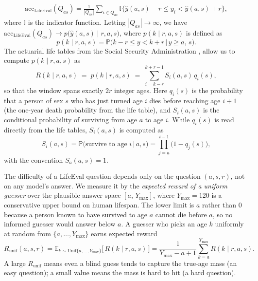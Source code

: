 \documentclass{article}
\begin{document}
\begin{align}
    \text{acc}_{\text{LifeEval}}(Q_{as})
    = \frac{1}{|Q_{as}|}\sum_{i\in Q_{as}}
      \mathbb{I}\bigl\{\hat{y}(a,s) - r \le y_i < \hat{y}(a,s) + r \bigr\},
\end{align}
where $\mathbb{I}$ is the indicator function. Letting $|Q_{as}|\to\infty$, we have $\text{acc}_{\text{LifeEval}}(Q_{as}) \rightarrow p\bigl(\hat{y}(a,s) \mid r,a,s\bigr)$, where $p(k \mid r,a,s)$ is defined as
\begin{equation}
    p(k \mid r,a,s) = \mathbb{P}\bigl( k - r \le y < k + r \,\big|\, y\geq a,\, s\bigr).
\end{equation}
The actuarial life tables from the Social Security Administration \citep{SSA2022LifeTable}, allow us to compute $p(k \mid r,a,s)$ as
\begin{equation}
    R(k \mid r,a,s) \;=\; p(k \mid r,a,s) \;=\; \sum_{i=k-r}^{k+r-1} S_i(a,s)\,q_i(s),
    \label{Def: p(k,r|a,s)}
\end{equation}
so that the window spans exactly $2r$ integer ages. Here $q_i(s)$ is the probability that a person of sex $s$ who has just turned age $i$ dies before reaching age $i+1$ (the one-year death probability from the life table), and $S_i(a,s)$ is the conditional probability of surviving from age $a$ to age $i$. While $q_i(s)$ is read directly from the life tables, $S_i(a,s)$ is computed as
\begin{equation}
        S_i(a, s) = \mathbb{P}\bigl( \text{survive to age } i \,\big|\, a,s\bigr)
        = \prod_{j=a}^{i-1} \bigl(1-q_j(s)\bigr),
\end{equation}
with the convention $S_a(a,s)=1$.

The difficulty of a LifeEval question depends only on the question $(a,s,r)$, not on any model's answer. We measure it by the \emph{expected reward of a uniform guesser} over the plausible answer space $[a,\,Y_{\max}]$, where $Y_{\max} = 120$ is a conservative upper bound on human lifespan. The lower limit is $a$ rather than $0$ because a person known to have survived to age $a$ cannot die before $a$, so no informed guesser would answer below $a$. A guesser who picks an age $k$ uniformly at random from $\{a,\dots,Y_{\max}\}$ earns expected reward
\begin{equation}
    R_{\text{unif}}(a,s,r)
    = \mathbb{E}_{k \sim \mathrm{Unif}\{a,\dots,Y_{\max}\}}\!\bigl[\,R(k \mid r,a,s)\,\bigr]
    = \frac{1}{Y_{\max}-a+1}\sum_{k=a}^{Y_{\max}} R(k \mid r,a,s).
    \label{eq:le_expected_reward}
\end{equation}
A large $R_{\text{unif}}$ means even a blind guess tends to capture the true-age mass (an easy question); a small value means the mass is hard to hit (a hard question). 
\end{document}
